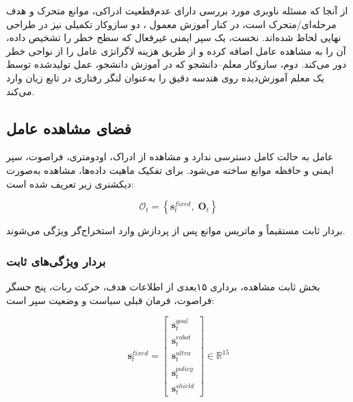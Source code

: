 از آنجا که مسئله ناوبری مورد بررسی دارای عدم‌قطعیت ادراکی، موانع متحرک و هدف مرحله‌ای/متحرک است، در کنار آموزش معمول ، دو سازوکار تکمیلی نیز در طراحی نهایی لحاظ شده‌اند. نخست، یک سپر ایمنی غیرفعال%
 که سطح خطر را تشخیص داده، آن را به مشاهده عامل اضافه کرده و از طریق هزینه لاگرانژی عامل را از نواحی خطر دور می‌کند. دوم، سازوکار معلم--دانشجو%
  که در آموزش دانشجو، عمل تولیدشده توسط یک معلم آموزش‌دیده روی هندسه دقیق را به‌عنوان لنگر رفتاری در تابع زیان وارد می‌کند.

\subsection{فضای مشاهده عامل}
\label{subsec:observation_space_final}

عامل به حالت کامل دسترسی ندارد و مشاهده از ادراک، اودومتری، فراصوت، سپر ایمنی و حافظه موانع ساخته می‌شود. برای تفکیک ماهیت داده‌ها، مشاهده به‌صورت دیکشنری زیر تعریف شده است:

\begin{equation}
	\mathcal{O}_t =
	\left\{
	\mathbf{s}^{fixed}_t,\;
	\mathbf{O}_t
	\right\}
	\label{eq:dict_observation_final}
\end{equation}

بردار ثابت مستقیماً و ماتریس موانع پس از پردازش  وارد استخراج‌گر ویژگی می‌شوند.

\subsubsection{بردار ویژگی‌های ثابت}
\label{subsubsec:fixed_features_final}

بخش ثابت مشاهده، برداری ۱۵بعدی از اطلاعات هدف، حرکت ربات، پنج حسگر فراصوت، فرمان قبلی سیاست و وضعیت سپر است:

\begin{equation}
	\mathbf{s}^{fixed}_t =
	\begin{bmatrix}
		\mathbf{s}^{goal}_t \\
		\mathbf{s}^{robot}_t \\
		\mathbf{s}^{ultra}_t \\
		\mathbf{s}^{policy}_t \\
		\mathbf{s}^{shield}_t
	\end{bmatrix}
	\in \mathbb{R}^{15}
	\label{eq:fixed_obs_15d_final}
\end{equation}

